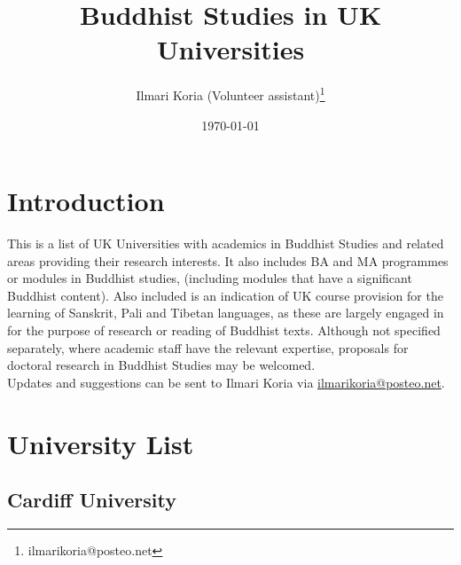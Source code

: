 \documentclass[a4paper,10.5pt]{article}
\author{Ilmari Koria (Volunteer assistant)\thanks{ilmarikoria@posteo.net}}
\date{\today}
\title{Buddhist Studies in UK Universities}
\begin{document}
\maketitle
\setcounter{tocdepth}{2}
\tableofcontents {} \newpage
\section{Introduction}
\label{sec:org8d5e6d8}
This is a list of UK Universities with academics in Buddhist Studies and related areas providing their research interests. It also includes BA and MA programmes or modules in Buddhist studies, (including modules that have a significant Buddhist content). Also included is an indication of UK course provision for the learning of Sanskrit, Pali and Tibetan languages, as these are largely engaged in for the purpose of research or reading of Buddhist texts. Although not specified separately, where academic staff have the relevant expertise, proposals for doctoral research in Buddhist Studies may be welcomed.\\

Updates and suggestions can be sent to Ilmari Koria via \href{mailto:ilmarikoria@posteo.net}{ilmarikoria@posteo.net}.\\

\section{University List}
\label{sec:org5d48abb}
\subsection{Cardiff University}
\label{sec:org75bcb04}
\end{document}

